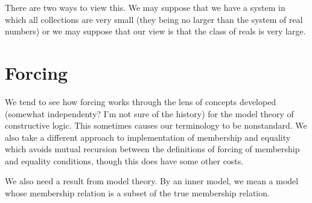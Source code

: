 \documentclass[12pt]{book}
\begin{document}
There are two ways to view this.  We may suppose that we have a system in which all collections are very small (they being no larger than the system of real numbers) or we may suppose that our view is that the class of reals is very large.

\newpage

\section{Forcing}

We tend to see how forcing works through the lens of concepts developed (somewhat independenty?  I'm not sure of the history) for the model theory of constructive logic.  This sometimes causes our terminology to be nonstandard.  We also take a different approach to implementation of membership and equality which avoids mutual recursion between the definitions of forcing of membership and equality conditions, though this does have some other costs.

We also need a result from model theory.  By an inner model, we mean a model whose membership relation is a subset of the true membership relation.
\end{document}
